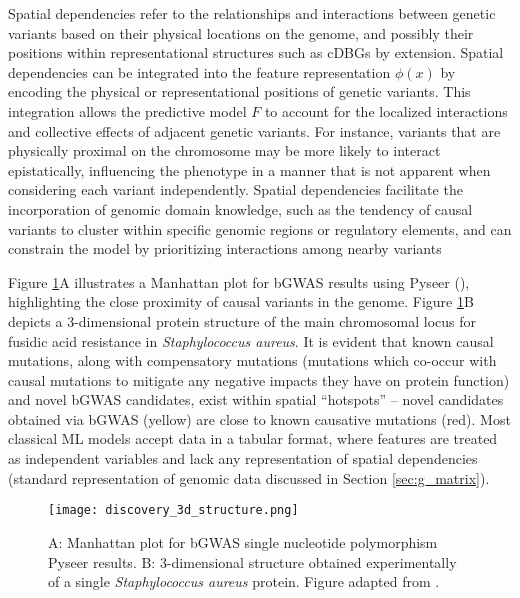\documentclass[12pt]{article}
\begin{document}
Spatial dependencies refer to the relationships and interactions between genetic variants based on their physical locations on the genome, and possibly their positions within representational structures such as cDBGs by extension. Spatial dependencies can be integrated into the feature representation $\phi(x)$ by encoding the physical or representational positions of genetic variants. This integration allows the predictive model $F$ to account for the localized interactions and collective effects of adjacent genetic variants. For instance, variants that are physically proximal on the chromosome may be more likely to interact epistatically, influencing the phenotype in a manner that is not apparent when considering each variant independently. Spatial dependencies facilitate the incorporation of genomic domain knowledge, such as the tendency of causal variants to cluster within specific genomic regions or regulatory elements, and can constrain the model by prioritizing interactions among nearby variants 

Figure \ref{fig:3d_structure}A illustrates a Manhattan plot for bGWAS results using Pyseer (\cite{lees2018pyseer}), highlighting the close proximity of causal variants in the genome. Figure \ref{fig:3d_structure}B depicts a 3-dimensional protein structure of the main chromosomal locus for fusidic acid resistance in \textit{Staphylococcus aureus}. It is evident that known causal mutations, along with compensatory mutations (mutations which co-occur with causal mutations to mitigate any negative impacts they have on protein function) and novel bGWAS candidates, exist within spatial ``hotspots'' -- novel candidates obtained via bGWAS (yellow) are close to known causative mutations (red). Most classical ML models accept data in a tabular format, where features are treated as independent variables and lack any representation of spatial dependencies (standard representation of genomic data discussed in Section \ref{sec:g_matrix}). 

\begin{figure}
    \centering
    \texttt{[image: discovery\_3d\_structure.png]}
    \caption{A: Manhattan plot for bGWAS single nucleotide polymorphism Pyseer results. B: 3-dimensional structure obtained experimentally of a single \textit{Staphylococcus aureus} protein. Figure adapted from \cite{wheeler2019contrasting}.}
    \label{fig:3d_structure}
\end{figure}
\end{document}
